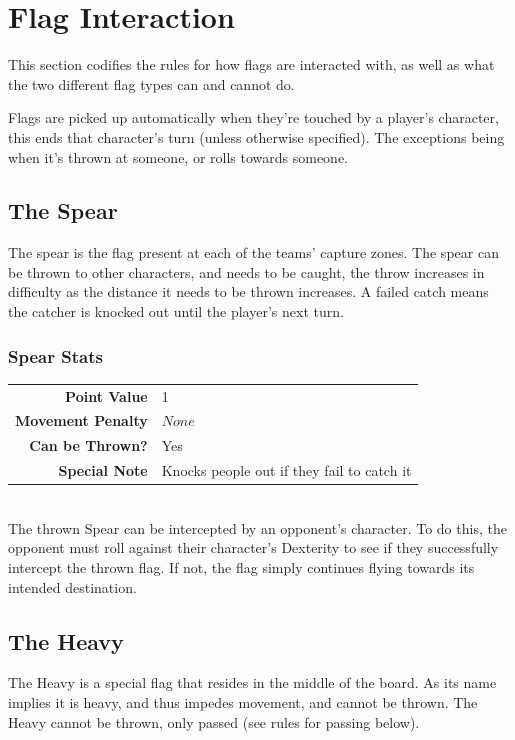 \section{Flag Interaction} \label{flag-interaction}
This section codifies the rules for how flags are interacted with, as well as what the two different flag types can and cannot do.

Flags are picked up automatically when they're touched by a player's character, this ends that character's turn (unless otherwise specified).
The exceptions being when it's thrown at someone, or rolls towards someone.

\subsection{The Spear}
The spear is the flag present at each of the teams' capture zones.
The spear can be thrown to other characters, and needs to be caught, the throw increases in difficulty as the distance it needs to be thrown increases. 
A failed catch means the catcher is knocked out until the player's next turn.

\subsubsection{Spear Stats}
\begin{tabular}{r|l}
    \textbf{Point Value} & 1 \\
    \textbf{Movement Penalty} & $None$ \\
    \textbf{Can be Thrown?} & Yes \\
    \textbf{Special Note} & Knocks people out if they fail to catch it \\
\end{tabular} \\

The thrown Spear can be intercepted by an opponent's character. 
To do this, the opponent must roll against their character's Dexterity to see if they successfully intercept the thrown flag. If not, the flag simply continues flying towards its intended destination.

\subsection{The Heavy}
The Heavy is a special flag that resides in the middle of the board. 
As its name implies it is heavy, and thus impedes movement, and cannot be thrown.
The Heavy cannot be thrown, only passed (see rules for passing below).
